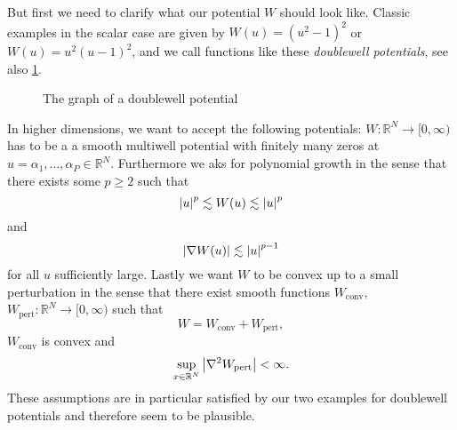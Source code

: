 But first we need to clarify what our potential $ W $ should look like. Classic examples in the scalar case are given by $ W ( u ) = \left( u^{ 2 } - 1 \right)^{ 2 } $ or $ W( u ) = u^{ 2 } ( u - 1 )^{ 2 } $, and we call functions like these \emph{doublewell potentials}, see also \ref{graph_of_doublewell_potential}.

\begin{figure}[h]
\label{graph_of_doublewell_potential}
\caption{The graph of a doublewell potential}
\end{figure}

In higher dimensions, we want to accept the following potentials: $ W \colon \mathbb{ R }^{ N } \to [0, \infty ) $ has to be a a smooth multiwell potential with finitely many zeros at $ u = \alpha_{ 1 }, \dotsc , \alpha_{ P } \in \mathbb{ R }^{ N } $. Furthermore we aks for polynomial growth in the sense that there exists some $ p \geq 2 $ such that
\begin{equation}
	\label{polynomial_growth}
	\abs{ u }^{ p } \lesssim W(u) \lesssim \abs{ u }^{ p }
\end{equation}
and
\begin{equation}
	\label{polynomial_growth_derivative}
	\abs{ \nabla W ( u ) } \lesssim \abs{ u }^{ p -1 }
\end{equation}
for all $ u $ sufficiently large. Lastly we want $ W $ to be convex up to a small perturbation in the sense that there exist smooth functions 
$ W_{ \mathrm{conv} }$, $ W_{ \mathrm{pert} } \colon \mathbb{ R }^{ N } \to [ 0 , \infty ) $ such that
\begin{equation}
	\label{decomposition_of_w}
	W = W_{ \mathrm{conv}} + W_{ \mathrm{pert}},
\end{equation}
$ W_{ \mathrm{conv} } $ is convex and
\begin{equation}
	\sup_{ x \in \mathbb{ R }^{ N } }
	\abs{ \nabla^{ 2 } W_{ \mathrm{pert} } } < \infty.
\end{equation}
These assumptions are in particular satisfied by our two examples for doublewell potentials and therefore seem to be plausible.




